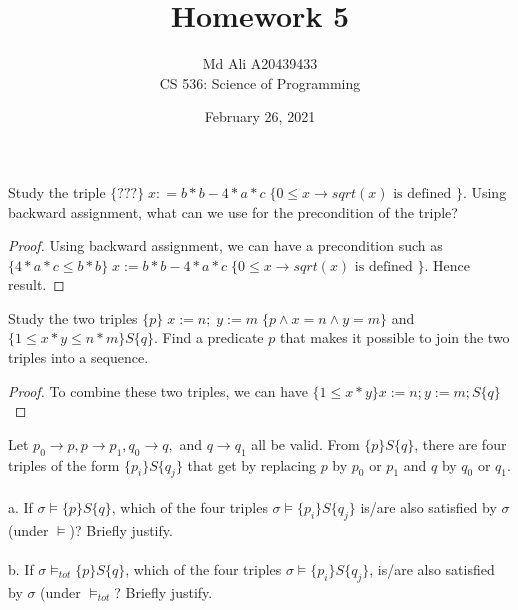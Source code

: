 \documentclass[12pt]{article}
\newenvironment{exercise}[2][Exercise]{\begin{trivlist}
\item[\hskip \labelsep {\bfseries #1}\hskip \labelsep {\bfseries #2.}]}{\end{trivlist}}
\begin{document}
 
\title{Homework 5}
\author{Md Ali A20439433 \\ 
CS 536: Science of Programming} 
\date{February 26, 2021}

\maketitle
 
\begin{exercise}{1}
Study the triple $\{???\}\; x : = b*b - 4 * a * c\; \{0 \leq x \rightarrow sqrt(x) \text{ is defined }\}$. Using backward assignment, what can we use for the precondition of the triple? 
\end{exercise} 

\begin{proof}
Using backward assignment, we can have a precondition such as $\{4*a*c \leq b*b \}\; x := b*b - 4*a*c\; \{0 \leq x \rightarrow sqrt(x) \text{ is defined }\}$. Hence result.

\end{proof}

\begin{exercise}{2}
Study the two triples $\{p\}\; x := n;\; y := m\; \{p \land x = n \land y = m\}$ and $\{1 \leq x * y \leq n * m\} S \{q\}$. Find a predicate $p$ that makes it possible to join the two triples into a sequence. 
\end{exercise}
 
\begin{proof}
To combine these two triples, we can have $\{ 1 \leq x*y \} x := n; y := m; S \{q\}$

\end{proof}

\begin{exercise}{3}
Let $p_{0} \rightarrow p, p \rightarrow p_{1}, q_{0} \rightarrow q,$ and $q \rightarrow q_{1}$ all be valid. From $\{ p \} S \{q\}$, there are four triples of the form $\{p_{i} \} S \{q_{j}\}$ that get by replacing $p$ by $p_{0}$ or $p_{1}$ and $q$ by $q_{0}$ or $q_{1}$. \\ \\ 
a. If $\sigma \models \{p\} S \{q\}$, which of the four triples $\sigma \models \{p_{i}\} S \{q_{j}\}$ is/are also satisfied by $\sigma$ (under $\models$)? Briefly justify. \\ \\
b. If $\sigma \models_{tot} \{p\} S \{q\}$, which of the four triples $\sigma \models \{p_{i}\} S \{q_{j}\}$, is/are also satisfied by $\sigma$ (under $\models_{tot}$? Briefly justify.
\end{exercise}
\end{document}
